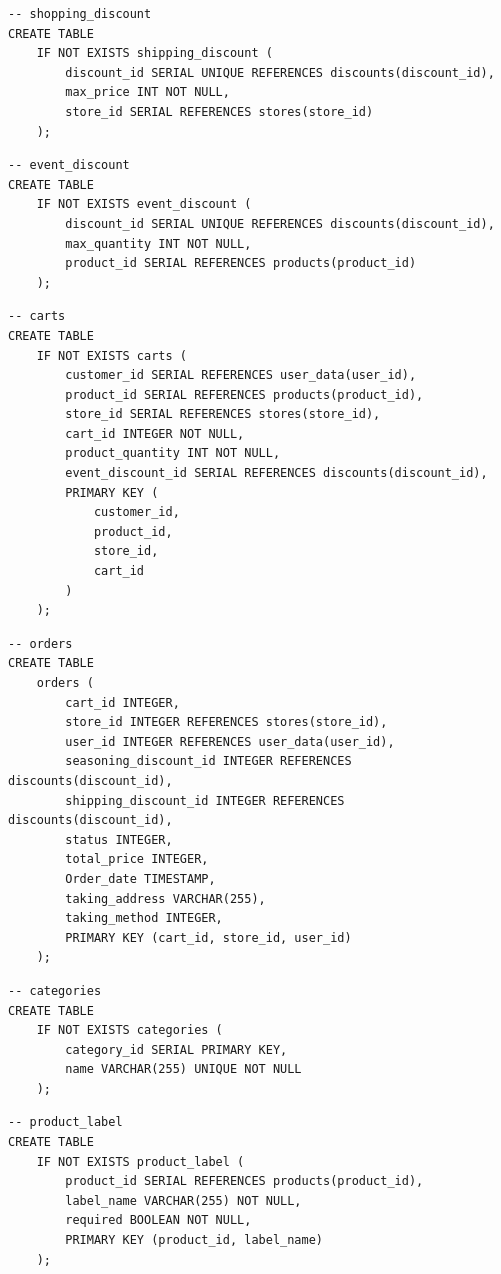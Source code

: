 \documentclass[a4paper, 12pt]{article}
\begin{document}
\begin{lstlisting}
-- shopping_discount
CREATE TABLE
    IF NOT EXISTS shipping_discount (
        discount_id SERIAL UNIQUE REFERENCES discounts(discount_id),
        max_price INT NOT NULL,
        store_id SERIAL REFERENCES stores(store_id)
    );
\end{lstlisting}

\begin{lstlisting}
-- event_discount
CREATE TABLE
    IF NOT EXISTS event_discount (
        discount_id SERIAL UNIQUE REFERENCES discounts(discount_id),
        max_quantity INT NOT NULL,
        product_id SERIAL REFERENCES products(product_id)
    );
\end{lstlisting}

\begin{lstlisting}
-- carts
CREATE TABLE
    IF NOT EXISTS carts (
        customer_id SERIAL REFERENCES user_data(user_id),
        product_id SERIAL REFERENCES products(product_id),
        store_id SERIAL REFERENCES stores(store_id),
        cart_id INTEGER NOT NULL,
        product_quantity INT NOT NULL,
        event_discount_id SERIAL REFERENCES discounts(discount_id),
        PRIMARY KEY (
            customer_id,
            product_id,
            store_id,
            cart_id
        )
    );
\end{lstlisting}

\begin{lstlisting}
-- orders
CREATE TABLE
    orders (
        cart_id INTEGER,
        store_id INTEGER REFERENCES stores(store_id),
        user_id INTEGER REFERENCES user_data(user_id),
        seasoning_discount_id INTEGER REFERENCES discounts(discount_id),
        shipping_discount_id INTEGER REFERENCES discounts(discount_id),
        status INTEGER,
        total_price INTEGER,
        Order_date TIMESTAMP,
        taking_address VARCHAR(255),
        taking_method INTEGER,
        PRIMARY KEY (cart_id, store_id, user_id)
    );
\end{lstlisting}

\begin{lstlisting}
-- categories
CREATE TABLE
    IF NOT EXISTS categories (
        category_id SERIAL PRIMARY KEY,
        name VARCHAR(255) UNIQUE NOT NULL
    );
\end{lstlisting}

\begin{lstlisting}
-- product_label
CREATE TABLE
    IF NOT EXISTS product_label (
        product_id SERIAL REFERENCES products(product_id),
        label_name VARCHAR(255) NOT NULL,
        required BOOLEAN NOT NULL,
        PRIMARY KEY (product_id, label_name)
    );
\end{lstlisting}
\end{document}
